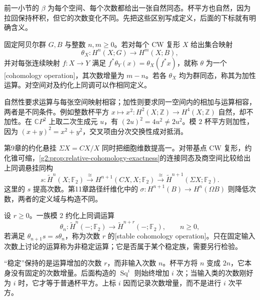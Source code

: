 前一小节的 \(\beta\) 为每个空间、每个次数都给出一张自然同态。杯平方也自然，因为拉回保持杯积，但它的次数变化不同。先把这些区别写成定义，后面的下标就有明确含义。

\begin{definition}[上同调运算]\label{g2:def:cohomology-operation}
	固定阿贝尔群 \(G,B\) 与整数 \(n,m\ge0\)。若对每个 CW 复形 \(X\) 给出集合映射
	\[
		\theta_X:H^n(X;G)\longrightarrow H^m(X;B),
	\]
	并对每张连续映射 \(f:X\to Y\) 满足 \(f^*\theta_Y(x)=\theta_X(f^*x)\)，就称 \(\theta\) 为一个[cohomology operation]，其次数增量为 \(m-n\)。若各 \(\theta_X\) 均为群同态，称其为加性运算。对空间对及约化上同调可以作相同定义。
\end{definition}

自然性要求运算与每张空间映射相容；加性则要求同一空间内的相加与运算相容，两者是不同条件。例如整数杯平方 \(x\mapsto x^2:H^2(X;\mathbb Z)\to H^4(X;\mathbb Z)\) 自然，却不加性。在 \(\mathbb CP^2\) 上取二次生成元 \(u\)，有 \((2u)^2=4u^2\ne2u^2\)。模 \(2\) 杯平方则加性，因为 \((x+y)^2=x^2+y^2\)，交叉项由分次交换性成对抵消。

\ProseParagraphBreak

第9章的约化悬挂 \(\Sigma X=CX/X\) 同时把细胞维数提高一。对带基点 CW 复形，约化锥可缩，\cref{g2:prop:relative-cohomology-exactness}的连接同态及商空间比较给出上同调悬挂同构
\begin{equation}\label{g2:eq:cohomology-suspension-upward}
	s:\widetilde H^n(X;\mathbb F_2)\xrightarrow{\cong}H^{n+1}(CX,X;\mathbb F_2)\xrightarrow{\cong}\widetilde H^{n+1}(\Sigma X;\mathbb F_2).
\end{equation}
这里的 \(s\) 提高次数。第11章路径纤维化中的 \(\sigma:H^{n+1}(B)\to H^n(\Omega B)\) 则降低次数，两者的定义域与构造不同。

\begin{definition}\label{g2:def:stable-cohomology-operation}
	设 \(r\ge0\)。一族模 \(2\) 约化上同调运算
	\[
		\theta_n:\widetilde H^n(-;\mathbb F_2)\longrightarrow\widetilde H^{n+r}(-;\mathbb F_2),\qquad n\ge0,
	\]
	若满足 \(\theta_{n+1}s=s\theta_n\)，称为次数 \(r\) 的[stable cohomology operation]。只在固定输入次数上讨论的运算称为非稳定运算；它是否属于某个稳定族，需要另行检验。
\end{definition}

“稳定”保持的是运算增加的次数 \(r\)，而非输入次数 \(n\)。杯平方将 \(n\) 变成 \(2n\)，它本身没有固定的次数增量。后面构造的 \(\operatorname{Sq}^i\) 则始终增加 \(i\) 次；当输入类的次数刚好为 \(i\) 时，它才等于普通杯平方。上标 \(i\) 因而记录次数增量，而不是进行 \(i\) 次平方。

